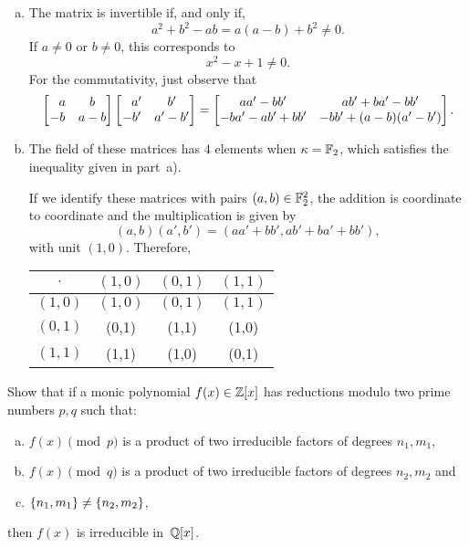\begin{solution}${}$
    \begin{enumerate}[a),font=\upshape]
        \item The matrix is invertible if, and only if,
        $$
            a^2+b^2-ab=a(a-b)+b^2\ne0.
        $$
        If $a\ne0$ or $b\ne0$, this corresponds to
        $$
            x^2-x+1\ne0.
        $$
        For the commutativity, just observe that
        \small
        $$
            \begin{bmatrix}
                \hphantom-a & b \\
                -b & a - b
            \end{bmatrix}
            \begin{bmatrix}
                \hphantom-a' & b' \\
                -b' & a' - b'
            \end{bmatrix}
            =
            \begin{bmatrix}
                aa'-bb' & ab'+ba'-bb'\\
                -ba'-ab'+bb' & -bb' +(a-b)(a'-b')
            \end{bmatrix}.
        $$
        \normalsize

        \item The field of these matrices has $4$ elements when $\kappa=\mathbb F_2$, which satisfies the inequality given in part~a).
        
        If we identify these matrices with pairs $(a,b)\in\mathbb F_2^2$, the addition is coordinate to coordinate and the multiplication is given by
        $$
            (a,b)(a',b') = (aa'+bb',ab'+ba'+bb'),
        $$
        with unit $(1,0)$. Therefore,
        \begin{table}[h!]
          \centering
          \begin{tabular}{c|ccc}
                $\cdot$& $(1,0)$&$(0,1)$ & $(1,1)$\\ \hline
                $(1,0)$&$(1,0)$&$(0,1)$ & $(1,1)$\\ \hline
                $(0, 1)$&(0,1)&(1,1)&(1,0)\\ \hline
                $(1, 1)$&(1,1)&(1,0)&(0,1)
          \end{tabular}
    \end{table}
    \end{enumerate}
\end{solution}

\begin{probl}
   Show that if a monic polynomial\/ $f(x) \in \mathbb{Z}[x]$ has reductions modulo two prime numbers\/ $p, q$ such that:
    \begin{enumerate}[a),font=\upshape]
        \item $f(x) \pmod{p}$ is a product of two irreducible factors of degrees\/ $n_1,m_1$,
        \item $f(x) \pmod{q}$ is a product of two irreducible factors of degrees\/ $n_2,m_2$ and
        \item $\{n_1,m_1\}\ne\{n_2,m_2\}$,
    \end{enumerate}
    then\/ $f(x)$ is irreducible in\/~$\mathbb{Q}[x]$.
\end{probl}

